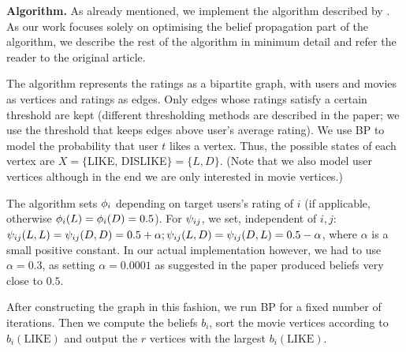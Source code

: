 \documentclass[draft,letterpaper]{article}
\newcommand{\mypar}[1]{{\bf #1.}}
\begin{document}
\mypar{Algorithm} As already mentioned, we implement the algorithm described by
\citet{top-n-recommendation}. As our work focuses solely on optimising the
belief propagation part of the algorithm, we describe the rest of the algorithm
in minimum detail and refer the reader to the original article.

The algorithm represents the ratings as a bipartite graph, with users and
movies as vertices and ratings as edges. Only edges whose ratings satisfy a
certain threshold are kept (different thresholding methods are described in the
paper; we use the threshold that keeps edges above user's average rating). We use BP to model the probability that user $t$ likes a vertex. Thus,
the possible states of each vertex are $X = \{$LIKE, DISLIKE$\} =
\{L, D\}$. (Note that we also model user vertices although in the end we are
only interested in movie vertices.)

The algorithm sets $\phi_i$ depending on target users's rating of $i$ (if applicable, otherwise $\phi_i(L) = \phi_i(D) = 0.5$). For $\psi_{ij}$, we set, independent of $i, j$:
$\psi_{ij}(L, L) = \psi_{ij}(D, D) = 0.5 + \alpha; \psi_{ij}(L,
D) = \psi_{ij}(D, L) = 0.5 - \alpha$, where
$\alpha$ is a small positive constant. In our actual implementation however, we had to use $\alpha = 0.3$, as setting $\alpha = 0.0001$ as suggested in the paper produced beliefs very close to $0.5$.

After constructing the graph in this fashion, we run BP for a fixed number of
iterations. Then we compute the beliefs $b_i$, sort the movie
vertices according to $b_i(\text{LIKE})$ and output the $r$ vertices with the
largest $b_i(\text{LIKE})$.
\end{document}
